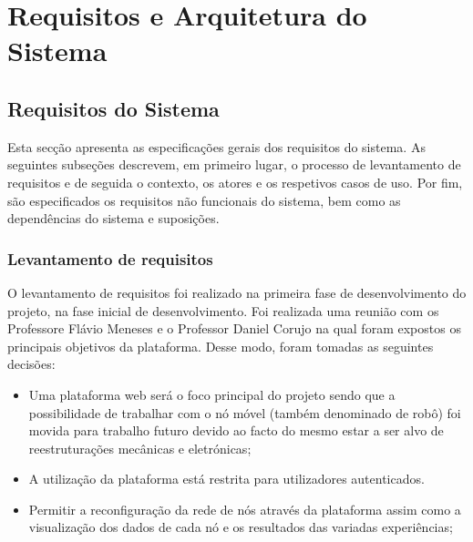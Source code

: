 \chapter{Requisitos e Arquitetura do Sistema}
\label{chp:requirements}
\section{Requisitos do Sistema}
Esta secção apresenta as especificações gerais dos requisitos do sistema. As seguintes subseções descrevem, em primeiro lugar, o processo de levantamento de requisitos e de seguida o contexto, os atores e os respetivos casos de uso. Por fim, são especificados os requisitos não funcionais do sistema, bem como as dependências do sistema e suposições.

\subsection{Levantamento de requisitos}
O levantamento de requisitos foi realizado na primeira fase de desenvolvimento do projeto,  na fase inicial de desenvolvimento. Foi realizada uma reunião com os Professore Flávio Meneses e o Professor Daniel Corujo na qual foram expostos os principais objetivos da plataforma.\newline
Desse modo, foram tomadas as seguintes decisões:
\begin{itemize}[noitemsep]
    \item Uma plataforma web será o foco principal do projeto sendo que a possibilidade de trabalhar com o nó móvel (também denominado de robô) foi movida para trabalho futuro devido ao facto do mesmo estar a ser alvo de reestruturações mecânicas e eletrónicas;
    \item A utilização da plataforma está restrita para utilizadores autenticados.
    \item Permitir a reconfiguração da rede de nós através da plataforma assim como a visualização dos dados de cada nó e os resultados das variadas experiências;
\end{itemize}

